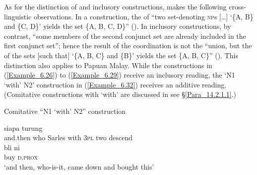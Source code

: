 As for the distinction of  and inclusory  constructions, \citet[33]{Haspelmath.2007c} makes the following cross-linguistic observations. In a   construction, the  of “two set-denoting \textsc{np}s [{\ldots}] ‘\{A, B\} and \{C, D\}’ yields the set \{A, B, C, D\}” (\citeyear*[33]{Haspelmath.2007c}). In inclusory  constructions, by contrast, “some members of the second conjunct set are already included in the first conjunct set”; hence the result of the coordination is not the “union, but the \textit{ }of the sets [such that] ‘\{A, B, C\} and \{B\}’ yields the set \{A, B, C\}” (\citeyear*[33]{Haspelmath.2007c}). This distinction also applies to Papuan Malay. While the constructions in (\ref{Example_6.26}) to (\ref{Example_6.29}) receive an inclusory reading, the  ‘N1  ‘with’ \textsc{N2}’  construction in (\ref{Example_6.32}) receives an additive reading. (Comitative  constructions with  ‘with’ are discussed in see §\ref{Para_14.2.1.1}.)



\begin{styleExampleTitle}
Comitative ``\textsc{N1}  ‘with’ \textsc{N2}''  construction
\end{styleExampleTitle}

\ea
\label{Example_6.32}
 {siapa} {} {} {} {} {turung}\\ %
 {and.then}  who  Sarles  with  \textsc{3pl}  two  descend\\
\gll bli  {ni}\\
 buy  {\textsc{d.prox}}\\

\glt
‘and then, who-is-it,  came down and bought this’ \textstyleExampleSource{[081022-003-Cv.0012]}
\z



